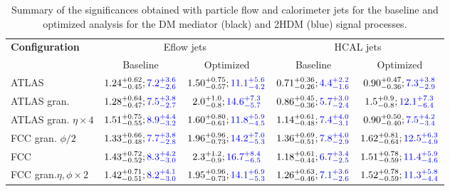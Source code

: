 \begin{table}[h]
	\caption{Summary of the significances obtained with particle flow and calorimeter jets for the baseline and optimized analysis for the DM mediator (black) and 2HDM (blue) signal processes.}
	\label{table:sum_DM}
	\centering
	\begin{tabular}{lcccc}
		\hline
		\multirow{2}{*}{\textbf{Configuration}} & \multicolumn{2}{c}{Eflow jets}    & \multicolumn{2}{c}{HCAL jets} \\ \cline{2-5} 
		& Baseline & Optimized & Baseline  & Optimized           \\ \midrule \midrule
		ATLAS& $1.24^{+0.62}_{-0.45};\textcolor{blue}{7.2^{+3.6}_{-2.6}}$& $1.50^{+0.75}_{-0.57};\textcolor{blue}{11.1^{+5.6}_{-4.2}}$  & $0.71^{+0.36}_{-0.26};\textcolor{blue}{4.4^{+2.2}_{-1.6}}$  & $0.90^{+0.47}_{-0.36};\textcolor{blue}{7.3^{+3.8}_{-2.9}}$           \\ 
		\rowcolor{black!7}ATLAS gran.& $1.28^{+0.64}_{-0.47};\textcolor{blue}{7.5^{+3.8}_{-2.7}}$ & $2.0^{+1.0}_{-0.8};\textcolor{blue}{14.6^{+7.3}_{-5.7}}$ & $0.86^{+0.45}_{-0.36};\textcolor{blue}{5.7^{+3.0}_{-2.4}}$ & $1.5^{+0.9}_{-0.8};\textcolor{blue}{12.1^{+7.3}_{-6.4}}$          \\ 
		ATLAS gran. $\eta\times 4$& $1.51^{+0.75}_{-0.55};\textcolor{blue}{8.9^{+4.4}_{-3.2}}$ & $1.60^{+0.80}_{-0.61};\textcolor{blue}{11.8^{+5.9}_{-4.5}}$ & $1.14^{+0.61}_{-0.48};\textcolor{blue}{7.4^{+4.0}_{-3.1}}$& $0.90^{+0.50}_{-0.40};\textcolor{blue}{7.5^{+4.2}_{-3.4}}$    \\ 
		\rowcolor{black!7}FCC gran. $\phi/2$& $1.33^{+0.66}_{-0.48};\textcolor{blue}{7.7^{+3.8}_{-2.8}}$ & $1.96^{+0.96}_{-0.73};\textcolor{blue}{14.2^{+7.0}_{-5.3}}$ & $1.36^{+0.69}_{-0.51};\textcolor{blue}{7.8^{+4.0}_{-2.9}}$ & $1.62^{+0.81}_{-0.64};\textcolor{blue}{12.5^{+6.3}_{-4.9}}$           \\ 
		FCC& $1.43^{+0.72}_{-0.52};\textcolor{blue}{8.3^{+4.2}_{-3.0}}$ & $2.3^{+1.2}_{-0.9};\textcolor{blue}{16.7^{+8.4}_{-6.5}}$ & $1.18^{+0.61}_{-0.44};\textcolor{blue}{6.7^{+3.4}_{-2.5}}$ & $1.51^{+0.78}_{-0.59};\textcolor{blue}{11.4^{+5.9}_{-4.6}}$           \\ 
		\rowcolor{black!7}FCC gran.$\eta,\phi \times 2$& $1.42^{+0.71}_{-0.51};\textcolor{blue}{8.2^{+4.1}_{-3.0}}$ & $1.95^{+0.96}_{-0.73};\textcolor{blue}{14.1^{+6.9}_{-5.3}}$ & $1.26^{+0.63}_{-0.46};\textcolor{blue}{7.1^{+3.6}_{-2.6}}$ & $1.52^{+0.78}_{-0.59};\textcolor{blue}{11.3^{+5.8}_{-4.4}}$ \\ \bottomrule
	\end{tabular}
	
\end{table}

